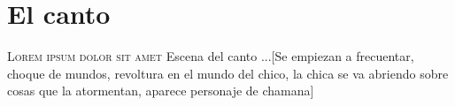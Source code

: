 

\chapter{El canto}
\lettrine{L}{orem ipsum dolor sit amet} Escena del canto
...[Se empiezan a frecuentar, choque de mundos, revoltura en el mundo del chico, la chica se va abriendo sobre cosas que la atormentan, aparece personaje de chamana]